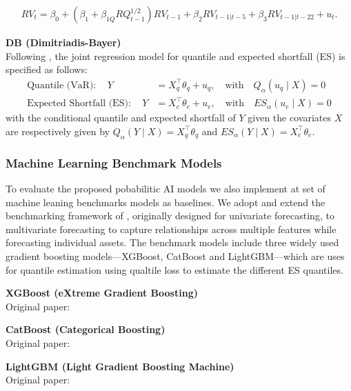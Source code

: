 \begin{equation}
    \begin{aligned}
        RV_t = \beta_0 + 
        ( \beta_1 + \beta_{1Q} RQ_{t-1}^{1/2}) RV_{t-1} 
        + \beta_2 RV_{t-1|t-5} 
        + \beta_3 RV_{t-1|t-22} 
        + u_t.
        \end{aligned}
\end{equation}
 

\textbf{DB (Dimitriadis-Bayer)} \\ 
Following \textcite{Dimitriadis_2019db}, the joint regression model for quantile  and expected shortfall (ES) is specified as follows:  
\begin{equation} 
    \begin{aligned}
        \text{Quantile (VaR)}:  \quad Y &= X_q^\top \theta_q + u_q, \quad \text{with} \quad Q_\alpha(u_q \mid X) = 0 \\
        \text{Expected Shortfall (ES)}: \quad Y &= X_e^\top \theta_e + u_e, \quad \text{with} \quad ES_\alpha(u_e \mid X) = 0
    \end{aligned}
\end{equation}
with the conditional quantile and expected shortfall of $Y$ given the covariates $X$ are respectively given by $Q_\alpha(Y \mid X) = X_q^\top \theta_q$ and $ES_\alpha(Y \mid X) = X_e^\top \theta_e$. 

\subsubsection{Machine Learning Benchmark Models}
To evaluate the proposed pobabilitic AI models we also implement at set of machine leaning benchmarks models as baselines. We adopt and extend the benchmarking framework of \textcite{moen2024forecasting}, originally designed for univariate  forecasting, to multivariate forecasting to capture relationships across multiple features while forecasting individual assets. The benchmark models include three widely used gradient boosting models—XGBoost, CatBoost and LightGBM—which are uses for quantile estimation using qualtile loss to estimate the different ES quantiles.  

\textbf{XGBoost (eXtreme Gradient Boosting)} \\
Original paper: \parencite{chen2016xgboost}

\textbf{CatBoost (Categorical Boosting)} \\
Original paper: \parencite{prokhorenkova2018catboost}

\textbf{LightGBM (Light Gradient Boosting Machine)} \\ 
Original paper: \parencite{ke2017lightgbm}

